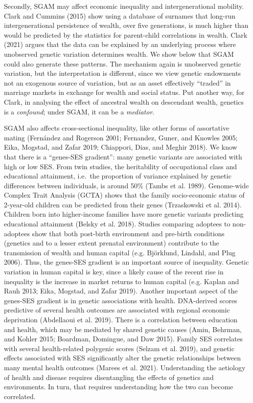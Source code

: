 \documentclass[
]{article}
\theoremstyle{definition}
\theoremstyle{definition}
\theoremstyle{definition}
\theoremstyle{definition}
\theoremstyle{remark}
\begin{document}
Secondly, SGAM may affect economic inequality and intergenerational mobility.
Clark and Cummins (2015) show using a database of surnames that long-run
intergenerational persistence of wealth, over five generations, is much higher
than would be predicted by the statistics for parent-child correlations in
wealth. Clark (2021) argues that the data can be explained by an underlying
process where unobserved genetic variation determines wealth. We show below
that SGAM could also generate these patterns. The mechanism again is
unobserved genetic variation, but the interpretation is different, since we
view genetic endowments not an exogenous source of variation, but as an asset
effectively ``traded'' in marriage markets in exchange for wealth and social
status. Put another way, for Clark, in analysing the effect of ancestral wealth
on descendant wealth, genetics is a \emph{confound}; under SGAM, it can be a
\emph{mediator}.

SGAM also affects cross-sectional inequality, like other forms of assortative
mating (Fernández and Rogerson 2001; Fernandez, Guner, and Knowles 2005; Eika, Mogstad, and Zafar 2019; Chiappori, Dias, and Meghir 2018). We know that there is a ``genes-SES gradient'': many
genetic variants are associated with high or low SES. From twin studies, the
heritability of occupational class and educational attainment, i.e.~the
proportion of variance explained by genetic differences between individuals, is
around 50\% (Tambs et al. 1989). Genome-wide Complex Trait Analysis (GCTA) shows that
the family socio-economic status of 2-year-old children can be predicted from
their genes (Trzaskowski et al. 2014). Children born into higher-income families have
more genetic variants predicting educational attainment (Belsky et al. 2018).
Studies comparing adoptees to non-adoptees show that both post-birth environment
and pre-birth conditions (genetics and to a lesser extent prenatal environment)
contribute to the transmission of wealth and human capital (e.g. Björklund, Lindahl, and Plug 2006). Thus, the genes-SES gradient is an important source of
inequality. Genetic variation in human capital is key, since a likely cause of
the recent rise in inequality is the increase in market returns to human capital
(e.g. Kaplan and Rauh 2013; Eika, Mogstad, and Zafar 2019). Another important aspect of the
genes-SES gradient is in genetic associations with health. DNA-derived scores
predictive of several health outcomes are associated with regional economic
deprivation (Abdellaoui et al. 2019). There is a correlation between education
and health, which may be mediated by shared genetic causes (Amin, Behrman, and Kohler 2015; Boardman, Domingue, and Daw 2015). Family SES correlates with several health-related polygenic
scores (Selzam et al. 2019), and genetic effects associated with SES
significantly alter the genetic relationships between many mental health
outcomes (Marees et al. 2021). Understanding the aetiology of health and disease
requires disentangling the effects of genetics and environments. In turn, that
requires understanding how the two can become correlated.
\end{document}
